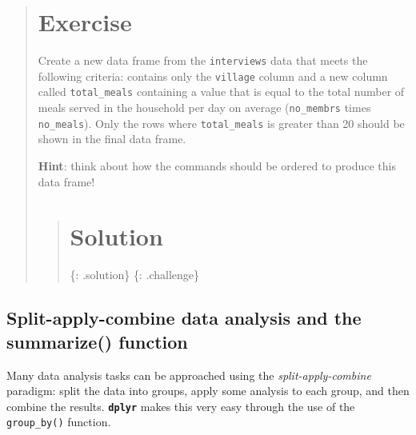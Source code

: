 \documentclass[]{book}
\newenvironment{Shaded}{\begin{snugshade}}{\end{snugshade}}
\newcommand{\KeywordTok}[1]{\textcolor[rgb]{0.13,0.29,0.53}{\textbf{#1}}}
\newcommand{\DataTypeTok}[1]{\textcolor[rgb]{0.13,0.29,0.53}{#1}}
\newcommand{\DecValTok}[1]{\textcolor[rgb]{0.00,0.00,0.81}{#1}}
\newcommand{\StringTok}[1]{\textcolor[rgb]{0.31,0.60,0.02}{#1}}
\newcommand{\OperatorTok}[1]{\textcolor[rgb]{0.81,0.36,0.00}{\textbf{#1}}}
\newcommand{\NormalTok}[1]{#1}
\begin{document}
\begin{quote}
\section{Exercise}\label{exercise-9}

Create a new data frame from the \texttt{interviews} data that meets the
following criteria: contains only the \texttt{village} column and a new
column called \texttt{total\_meals} containing a value that is equal to
the total number of meals served in the household per day on average
(\texttt{no\_membrs} times \texttt{no\_meals}). Only the rows where
\texttt{total\_meals} is greater than 20 should be shown in the final
data frame.

\textbf{Hint}: think about how the commands should be ordered to produce
this data frame!

\begin{quote}
\section{Solution}\label{solution-10}

\begin{Shaded}
\end{Shaded}

\{: .solution\} \{: .challenge\}
\end{quote}
\end{quote}

\subsection{Split-apply-combine data analysis and the summarize()
function}\label{split-apply-combine-data-analysis-and-the-summarize-function}

Many data analysis tasks can be approached using the
\emph{split-apply-combine} paradigm: split the data into groups, apply
some analysis to each group, and then combine the results.
\textbf{\texttt{dplyr}} makes this very easy through the use of the
\texttt{group\_by()} function.
\end{document}
